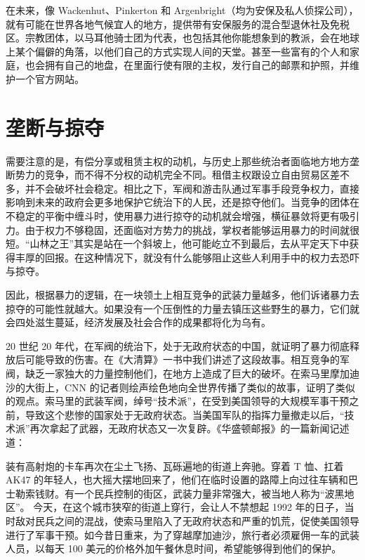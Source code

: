 在未来，像 Wackenhut、Pinkerton 和 Argenbright（均为安保及私人侦探公司），就有可能在世界各地气候宜人的地方，提供带有安保服务的混合型退休社及免税区。宗教团体，以马耳他骑士团为代表，也包括其他你能想象到的教派，会在地球上某个偏僻的角落，以他们自己的方式实现人间的天堂。甚至一些富有的个人和家庭，也会拥有自己的地盘，在里面行使有限的主权，发行自己的邮票和护照，并维护一个官方网站。

\section{垄断与掠夺}
需要注意的是，有偿分享或租赁主权的动机，与历史上那些统治者面临地方地方垄断势力的竞争，而不得不分权的动机完全不同。租借主权跟设立自由贸易区差不多，并不会破坏社会稳定。相比之下，军阀和游击队通过军事手段竞争权力，直接影响到未来的政府会更多地保护它统治下的人民，还是掠夺他们。当竞争的团体在不稳定的平衡中缠斗时，使用暴力进行掠夺的动机就会增强，横征暴敛将更有吸引力。由于权力不够稳固，还面临对方势力的挑战，掌权者能够运用暴力的时间就很短。“山林之王”其实是站在一个斜坡上，他可能屹立不到最后，去从平定天下中获得丰厚的回报。在这种情况下，就没有什么能够阻止这些人利用手中的权力去恐吓与掠夺。

因此，根据暴力的逻辑，在一块领土上相互竞争的武装力量越多，他们诉诸暴力去掠夺的可能性就越大。如果没有一个压倒性的力量去镇压这些野生的暴力，它们就会四处滋生蔓延，经济发展及社会合作的成果都将化为乌有。

20 世纪 20 年代，在军阀的统治下，处于无政府状态的中国，就证明了暴力彻底释放后可能导致的伤害。在《大清算》一书中我们讲述了这段故事。相互竞争的军阀，缺乏一家独大的力量控制他们，在地方上造成了巨大的破坏。在索马里摩加迪沙的大街上，CNN 的记者则绘声绘色地向全世界传播了类似的故事，证明了类似的观点。索马里的武装军阀，绰号“技术派”，在受到美国领导的大规模军事干预之前，导致这个悲惨的国家处于无政府状态。当美国军队的指挥力量撤走以后，“技术派”再次拿起了武器，无政府状态又一次复辟。《华盛顿邮报》的一篇新闻记述道：

\begin{tcolorbox}
\kaishu 装有高射炮的卡车再次在尘土飞扬、瓦砾遍地的街道上奔驰。穿着 T 恤、扛着 AK47 的年轻人，也大摇大摆地回来了，他们在临时设置的路障上向过往车辆和巴士勒索钱财。有一个民兵控制的街区，武装力量非常强大，被当地人称为“波黑地区”。
今天，在这个城市狭窄的街道上穿行，会让人不禁想起 1992 年的日子，当时敌对民兵之间的混战，使索马里陷入了无政府状态和严重的饥荒，促使美国领导进行了军事干预。如今昔日重来，为了穿越摩加迪沙，旅行者必须雇佣一车的武装人员，以每天 100 美元的价格外加午餐休息时间，希望能够得到他们的保护。
\end{tcolorbox}

